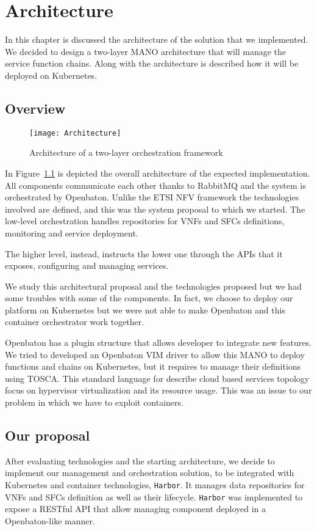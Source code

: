 \chapter{Architecture}
\label{chap:archimpl}
 
In this chapter is discussed the architecture of the solution that we
implemented. We decided to design a two-layer MANO architecture that will manage
the service function chains. Along with the architecture is described how it
will be deployed on Kubernetes.

\section{Overview}
\begin{figure}[H]
  \centering
  \texttt{[image: Architecture]}
  \caption{Architecture of a two-layer orchestration framework}
  \label{chap:archimpl:img:architecture}
\end{figure}
In Figure~\ref{chap:archimpl:img:architecture} is depicted the overall
architecture of the expected implementation. All components communicate each
other thanks to RabbitMQ and the system is orchestrated by Openbaton. Unlike the
ETSI NFV framework the technologies involved are defined, and this was the
system proposal to which we started. The low-level orchestration handles
repositories for VNFs and SFCs definitions, monitoring and service deployment.

The higher level, instead, instructs the lower one through the APIs that it
exposes, configuring and managing services. 

We study this architectural proposal and the technologies proposed but we had
some troubles with some of the components. In fact, we choose to deploy our
platform on Kubernetes but we were not able to make Openbaton and this container
orchestrator work together.

Openbaton has a plugin structure that allows developer to integrate new
features. We tried to developed an Openbaton VIM driver to allow this MANO to
deploy functions and chains on Kubernetes, but it requires to manage their
definitions using TOSCA. This standard language for describe cloud based
services topology focus on hypervisor virtualization and its resource usage.
This was an issue to our problem in which we have to exploit containers.

\section{Our proposal}
After evaluating technologies and the starting architecture, we decide to
implement our management and orchestration solution, to be integrated with
Kubernetes and container technologies, \texttt{Harbor}. It manages data
repositories for VNFs and SFCs definition as well as their lifecycle.
\texttt{Harbor} was implemented to expose a RESTful API that allow managing
component deployed in a Openbaton-like manner. 

